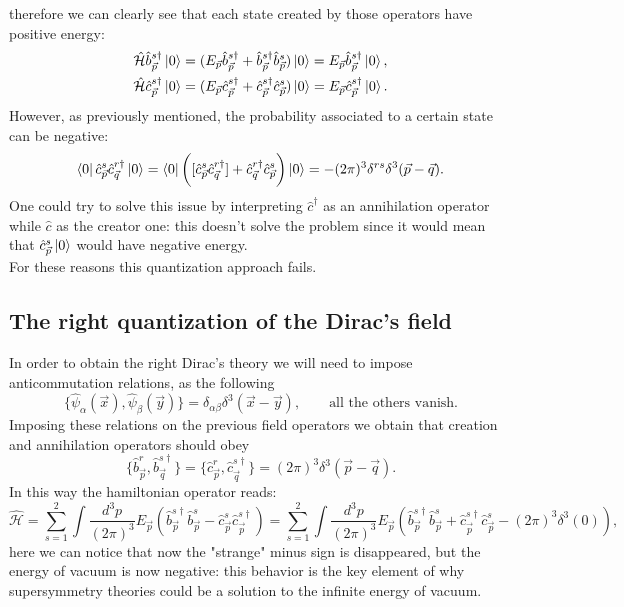 therefore we can clearly see that each state created by those operators have positive energy:
\begin{align*}
    \hat{\mathcal{H} }\hat{b}^{s\dagger}_{\vec{p}}\ket{0}&=(E_{\vec p}\hat{b}^{s\dagger}_{\vec p}+\hat{b}^{s\dagger}_{\vec{p}}\hat{b}^{s}_{\vec{p}})\ket{0}=E_{\vec p}\hat{b}^{s\dagger}_{\vec p}\ket{0},\\
    \hat{\mathcal{H} }\hat{c}^{s\dagger}_{\vec{p}}\ket{0}&=(E_{\vec p}\hat{c}^{s\dagger}_{\vec p}+\hat{c}^{s\dagger}_{\vec{p}}\hat{c}^{s}_{\vec{p}})\ket{0}=E_{\vec p}\hat{c}^{s\dagger}_{\vec p}\ket{0}.
\end{align*}
However, as previously mentioned, the probability associated to a certain state can be negative:
\begin{equation*}
    \bra{0}\hat{c}_{\vec p}^{s}\hat{c}_{\vec q}^{r\dagger}\ket{0}=\bra{0}\bigg([\hat{c}_{\vec p}^{s}\hat{c}_{\vec q}^{r\dagger}]+\hat{c}_{\vec q}^{r\dagger}\hat{c}_{\vec p}^{s}\bigg)\ket{0}=-(2\pi)^3\delta^{rs}\delta^3(\vec p-\vec q).
\end{equation*}
One could try to solve this issue by interpreting $\hat{c}^\dagger$ as an annihilation operator while $\hat c$ as the creator one: this doesn't solve the problem since it would mean that $\hat{c}^s_{\vec p}\ket{0}$ would have negative energy.\\
For these reasons this quantization approach fails.
\subsection{The right quantization of the Dirac's field}
In order to obtain the right Dirac's theory we will need to impose anticommutation relations, as the following
\begin{equation*}
    \{\hat{\psi}_\alpha(\vec x),\hat{\psi}_\beta(\vec y)\}=\delta_{\alpha\beta}\delta^3(\vec x-\vec y),\qquad \text{all the others vanish.}
\end{equation*}
Imposing these relations on the previous field operators we obtain that creation and annihilation operators should obey 
\begin{equation*}
    \{\hat{b}^r_{\vec p},\hat{b}^{s\dagger}_{\vec q}\}=\{\hat{c}^r_{\vec p},\hat{c}^{s\dagger}_{\vec q}\}=(2\pi)^3\delta^3(\vec p-\vec q).
\end{equation*}
In this way the hamiltonian operator reads:
\begin{equation*}
    \hat{\mathcal{H} }=\sum_{s=1}^{2}\int\frac{d^3p}{(2\pi)^3}E_{\vec p}(\hat{b}^{s\dagger}_{\vec p}\hat{b}^{s}_{\vec p}-\hat{c}^{s}_{\vec p}\hat{c}^{s\dagger}_{\vec p})=\sum_{s=1}^{2}\int\frac{d^3p}{(2\pi)^3}E_{\vec p}(\hat{b}^{s\dagger}_{\vec p}\hat{b}^{s}_{\vec p}+\hat{c}^{s\dagger}_{\vec p}\hat{c}^{s}_{\vec p}-(2\pi)^3\delta^3(0)),
\end{equation*}
here we can notice that now the "strange" minus sign is disappeared, but the energy of vacuum is now negative: this behavior is the key element of why supersymmetry theories could be a solution to the infinite energy of vacuum.\\

